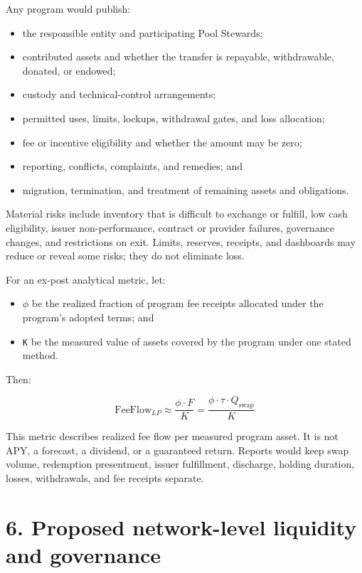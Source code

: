 \documentclass[11pt]{article}
\begin{document}
Any program would publish:

\begin{itemize}[leftmargin=*]
\item the responsible entity and participating Pool Stewards;
\item contributed assets and whether the transfer is repayable, withdrawable, donated, or endowed;
\item custody and technical-control arrangements;
\item permitted uses, limits, lockups, withdrawal gates, and loss allocation;
\item fee or incentive eligibility and whether the amount may be zero;
\item reporting, conflicts, complaints, and remedies; and
\item migration, termination, and treatment of remaining assets and obligations.
\end{itemize}
Material risks include inventory that is difficult to exchange or fulfill, low cash eligibility, issuer non-performance, contract or provider failures, governance changes, and restrictions on exit. Limits, reserves, receipts, and dashboards may reduce or reveal some risks; they do not eliminate loss.

For an ex-post analytical metric, let:

\begin{itemize}[leftmargin=*]
\item \texttt{$\phi$} be the realized fraction of program fee receipts allocated under the program's adopted terms; and
\item \texttt{K} be the measured value of assets covered by the program under one stated method.
\end{itemize}
Then:

\[
\mathrm{FeeFlow}_{LP} \approx \frac{\phi \cdot F}{K} = \frac{\phi \cdot \tau \cdot Q_{\mathrm{swap}}}{K}
\]

This metric describes realized fee flow per measured program asset. It is not APY, a forecast, a dividend, or a guaranteed return. Reports would keep swap volume, redemption presentment, issuer fulfillment, discharge, holding duration, losses, withdrawals, and fee receipts separate.


\section*{6. Proposed network-level liquidity and governance}
\end{document}
